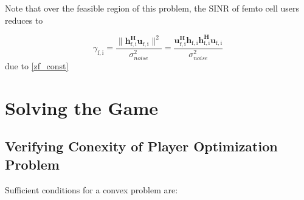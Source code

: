 \documentclass[12pt]{article}
\begin{document}
	
Note that over the feasible region of this problem, the SINR of femto cell users reduces to 

	\begin{equation}\label{zf_snr}
	\gamma_{\mathrm{f,i}} = \frac{\|\mathbf{h^H_{\mathrm{f,i}}u_{\mathrm{f,i}}}\|^2}
	{\sigma^2_{noise}  
	}
	= 
	\frac{\mathbf{u^H_{\mathrm{f,i}}h_{\mathrm{f,i}}h^H_{\mathrm{f,i}}u_{\mathrm{f,i}}}}
	{\sigma^2_{noise}  
	}
	\end{equation}
due to  \eqref{zf_const}
\section{Solving the Game}

\subsection{Verifying Conexity of Player Optimization Problem}

Sufficient conditions for a convex problem are:
\end{document}
